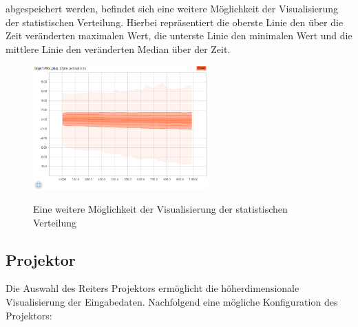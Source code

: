 abgespeichert werden, befindet sich eine weitere Möglichkeit der Visualisierung der statistischen Verteilung. Hierbei repräsentiert die oberste Linie den über die Zeit veränderten maximalen Wert, die unterste Linie den minimalen Wert und die mittlere Linie den veränderten Median über der Zeit. \cite{tensorboard.2017}

\begin{figure}[h!]
	\centering
	 \includegraphics[width=0.6\textwidth]{images/Kapitel_3/distribution.png}\\
	\vspace{10pt} 
	\caption[Eine weitere Möglichkeit der Visualisierung der statistischen Verteilung]{Eine weitere Möglichkeit der Visualisierung der statistischen Verteilung}
	\label{fig:verteilung}
\end{figure}




\subsection{Projektor}


Die Auswahl des Reiters Projektors ermöglicht die höherdimensionale Visualisierung der Eingabedaten. Nachfolgend eine mögliche Konfiguration des Projektors:
\vspace{0.1cm}
\\

